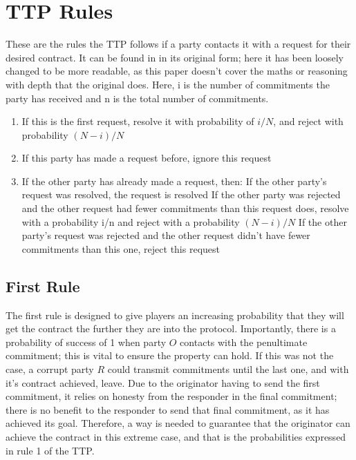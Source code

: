 \documentclass{l4proj}
\begin{document}
\section{TTP Rules}
These are the rules the TTP follows if a party contacts it with a request for their desired contract. It can be found in \cite{ASW09} in its original form; here it has been loosely changed to be more readable, as this paper doesn't cover the maths or reasoning with depth that the original does. Here, i is the number of commitments the party has received and n is the total number of commitments.

\begin{enumerate}
\item If this is the first request, resolve it with probability of $i/N$, and reject with probability $(N-i)/N$
\item If this party has made a request before, ignore this request
\item If the other party has already made a request, then:
\subitem If the other party's request was resolved, the request is resolved
\subitem If the other party was rejected and the other request had fewer commitments than this request does, resolve with a probability i/n and reject with a probability $(N-i)/N$
\subitem If the other party's request was rejected and the other request didn't have fewer commitments than this one, reject this request
\end{enumerate}

\subsection{First Rule}
The first rule is designed to give players an increasing probability that they will get the contract the further they are into the protocol. Importantly, there is a probability of success of 1 when party $O$ contacts with the penultimate commitment; this is vital to ensure the property can hold. If this was not the case, a corrupt party $R$ could transmit commitments until the last one, and with it's contract achieved, leave. Due to the originator having to send the first commitment, it relies on honesty from the responder in the final commitment; there is no benefit to the responder to send that final commitment, as it has achieved its goal. Therefore, a way is needed to guarantee that the originator can achieve the contract in this extreme case, and that is the probabilities expressed in rule 1 of the TTP.
\end{document}
